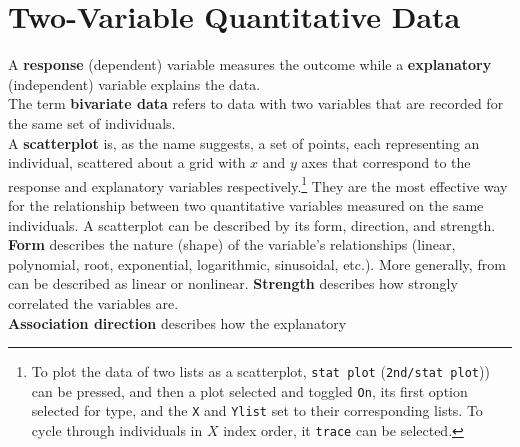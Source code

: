\documentclass[../AP_Statistics.tex]{subfiles}
\begin{document}
	\chapter{Two-Variable Quantitative Data}
		A \textbf{response} (dependent) variable measures the outcome while a \textbf{explanatory} (independent) variable explains the data. \\
		The term \textbf{bivariate data} refers to data with two variables that are recorded for the same set of individuals. \\
		A \textbf{scatterplot} is, as the name suggests, a set of points, each representing an individual, scattered about a grid with $x$ and $y$ axes that correspond to the response and explanatory variables respectively.\footnote{To plot the data of two lists as a scatterplot, \texttt{stat plot} (\texttt{2nd/stat plot})) can be pressed, and then a plot selected and toggled \texttt{On}, its first option selected for type, and the \texttt{X} and \texttt{Ylist} set to their corresponding lists. To cycle through individuals in $X$ index order, it \texttt{trace} can be selected.} They are the most effective way for the relationship between two quantitative variables measured on the same individuals.
		A scatterplot can be described by its form, direction, and strength. \\
		\textbf{Form} describes the nature (shape) of the variable's relationships (linear, polynomial, root, exponential, logarithmic, sinusoidal, etc.). More generally, from can be described as linear or nonlinear.
		\textbf{Strength} describes how strongly correlated the variables are. \\
		\textbf{Association direction} describes how the explanatory
\end{document}
